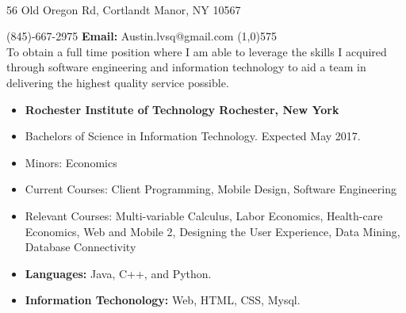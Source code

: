 \documentclass[10pt]{article}
\begin{document}
\begin{center}
\\
\vspace{.3ex}
56 Old Oregon Rd, Cortlandt Manor, NY 10567
\end{center}
 (845)-667-2975 \hfill {\bf Email:} Austin.lvsq@gmail.com
\line(1,0){575}\\

To obtain a full time position where I am able to leverage the skills I acquired through software engineering and information technology to aid a team in delivering the highest quality service possible.
\vspace{1ex}\\
\begin{itemize}[topsep=1ex, itemsep=.25ex, partopsep=0ex, parsep=0ex]
	\item[]{{\bf Rochester Institute of Technology \hfill Rochester, New York}}
  \item[] Bachelors of Science in Information Technology. \hfill Expected May 2017.
  \item[] Minors: Economics
  
  \item[] {Current Courses:} Client Programming, Mobile Design, Software Engineering 
  \item[] {Relevant Courses:} Multi-variable Calculus, Labor Economics, Health-care Economics, Web and Mobile 2, Designing the User Experience, Data Mining, Database Connectivity
\end{itemize}
\vspace{1ex}
\begin{itemize} [topsep=1ex, itemsep=.25ex, partopsep=0ex, parsep=0ex]
	\item[] {\bf Languages:} Java, C++, and Python.
 	\item[] {\bf Information Techonology:} Web, HTML, CSS, Mysql.
\end{itemize}
\vspace{1ex}
\end{document}
